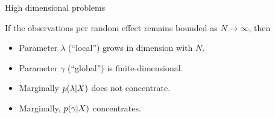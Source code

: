
\begin{frame}{High dimensional problems}

    If the observations per random effect remains bounded as $N \rightarrow
    \infty$, then
    \begin{itemize}
    \item Parameter $\lambda$ (``local'') grows in dimension with $N$.
    \item Parameter $\gamma$ (``global'') is finite-dimensional.
    \item Marginally $p(\lambda \vert X)$ does not concentrate.
    \item Marginally, $p(\gamma \vert X)$ concentrates.
    \end{itemize}
    

\spskip
\pause
{}

%
\end{frame}





